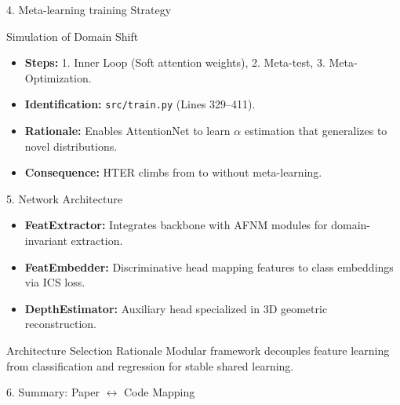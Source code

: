 \begin{frame}{4. Meta-learning training Strategy}
    \begin{block}{Simulation of Domain Shift}
        \begin{itemize}
            \item \textbf{Steps:} 1. Inner Loop (Soft attention weights), 2. Meta-test, 3. Meta-Optimization.
            \item \textbf{Identification:} \texttt{src/train.py} (Lines 329--411). 
            \item \textbf{Rationale:} Enables AttentionNet to learn $\alpha$ estimation that generalizes to novel distributions.
            \item \textbf{Consequence:} HTER climbs from  to  without meta-learning.
        \end{itemize}
    \end{block}
\end{frame}

\begin{frame}{5. Network Architecture}
    \begin{itemize}
        \item \textbf{FeatExtractor:} Integrates backbone with AFNM modules for domain-invariant extraction.
        \item \textbf{FeatEmbedder:} Discriminative head mapping features to class embeddings via ICS loss.
        \item \textbf{DepthEstimator:} Auxiliary head specialized in 3D geometric reconstruction.
    \end{itemize}
    \vfill
    \begin{block}{Architecture Selection Rationale}
        Modular framework decouples feature learning from classification and regression for stable shared learning.
    \end{block}
\end{frame}

\begin{frame}{6. Summary: Paper $\leftrightarrow$ Code Mapping}
    \centering
\end{frame}
